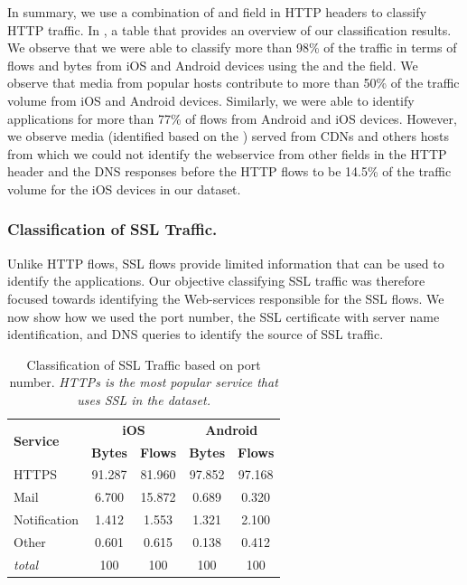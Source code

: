 In summary, we use a combination of \useragent and \httphost field in HTTP headers to classify HTTP traffic.
In , a table that provides an overview of our classification results.
We observe that we were able to classify more than 98\% of the traffic in terms of flows and bytes from iOS and Android devices using the \useragent and the \httphost field. 
We observe that media from popular hosts contribute to more than 50\% of the traffic volume from iOS and Android devices.
Similarly, we were able to identify applications for more than 77\% of flows from Android and iOS devices. 
However, we observe media (identified based on the \useragent) served from CDNs and others hosts from which we could not identify the webservice from other fields in the HTTP header and the DNS responses before the HTTP flows to be 14.5\% of the traffic volume for the iOS devices in our dataset.

\subsubsection{Classification of SSL Traffic.}

Unlike HTTP flows, SSL flows provide limited information that can be used to identify the applications. 
Our objective classifying SSL traffic was therefore focused towards identifying the Web-services responsible for the SSL flows. 
We now show how we used the port number, the SSL certificate with server name identification, and DNS queries to identify the source of SSL traffic. 

\begin{table}
\centering
\begin{small}
\begin{tabular}{|p{}|c|c|c|c|}
\hline
\multirow{2}{*}{\bf Service} & \multicolumn{2}{c|}{\bf iOS} &  \multicolumn{2}{c|}{\bf Android} \tabularnewline
\cline{2-5}
  & {\bf Bytes}  & {\bf Flows} & {\bf Bytes} & {\bf Flows} \tabularnewline
\hline
HTTPS                   & 91.287 & 81.960 & 97.852 & 97.168    \tabularnewline
\hline
Mail                    &  6.700 & 15.872 & 0.689  & 0.320  \tabularnewline
\hline
Notification            &  1.412 & 1.553  & 1.321  & 2.100  \tabularnewline
\hline
Other                   &  0.601 & 0.615  & 0.138  & 0.412 \tabularnewline
\hline
{\em total}             & 100 & 100 & 100 & 100 \tabularnewline
\hline
\end{tabular}
\end{small}
\caption{Classification of SSL Traffic based on port number. \emph{HTTPs is the most popular service that uses SSL in the \mobWild dataset.}}
\label{tab:classify-ssl-port}
\end{table}

